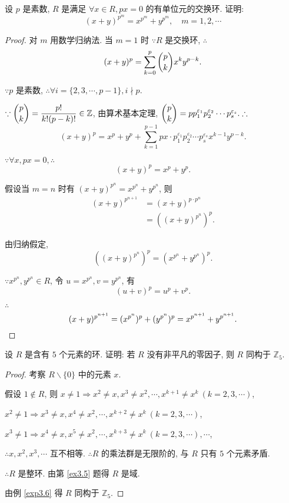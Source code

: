 \documentclass{ctexart}
\begin{document}
\begin{exercise}[3.6]
    设 $p$ 是素数, $R$ 是满足 $\forall x\in R,px=0$ 的有单位元的交换环. 证明:
    \[(x+y)^{p^m}=x^{p^m}+y^{p^m},\quad m=1,2,\cdots\]
\end{exercise}
\begin{proof}
    对 $m$ 用数学归纳法. 当 $m=1$ 时 $\because R$ 是交换环, $\therefore$
    \[(x+y)^p=\sum_{k=0}^p\dbinom{p}{k}x^ky^{p-k}.\]

    $\because p$ 是素数, $\therefore\forall i=\{2,3,\cdots,p-1\},i\nmid p$.

    $\because\dbinom{p}{k}=\dfrac{p!}{k!(p-k)!}\in\mathbb{Z}$, 由算术基本定理, $\dbinom{p}{k}=pp_1^{\varepsilon_1}p_2^{\varepsilon_2}\cdots p_s^{\varepsilon_s}.\therefore$
    \[(x+y)^p=x^p+y^p+\sum_{k=1}^{p-1}px\cdot p_1^{\varepsilon_1}p_2^{\varepsilon_2}\cdots p_s^{\varepsilon_s}x^{k-1}y^{p-k}.\]

    $\because\forall x,px=0,\therefore$
    \[(x+y)^p=x^p+y^p.\]

    假设当 $m=n$ 时有 $(x+y)^{p^n}=x^{p^n}+y^{p^n}$, 则
    \begin{align*}
        (x+y)^{p^{n+1}} & =(x+y)^{p\cdot p^n} \\
        & =((x+y)^{p^n})^p.
    \end{align*}

    由归纳假定,
    \[((x+y)^{p^n})^p=(x^{p^n}+y^{p^n})^p.\]

    $\because x^{p^n},y^{p^n}\in R$, 令 $u=x^{p^n},v=y^{p^n}$, 有
    \[(u+v)^p=u^p+v^p.\]

    $\therefore$
    \[(x+y)^{p^{n+1}}=(x^{p^n})^p+(y^{p^n})^p=x^{p^{n+1}}+y^{p^{n+1}}.\qedhere\]
\end{proof}
\begin{exercise}[3.7]
    设 $R$ 是含有 $5$ 个元素的环. 证明: 若 $R$ 没有非平凡的零因子, 则 $R$ 同构于 $\mathbb{Z}_5$.
\end{exercise}
\begin{proof}
    考察 $R\backslash\{0\}$ 中的元素 $x$.

    假设 $1\notin R$, 则 $x\neq 1\Rightarrow x^2\neq x,x^3\neq x^2,\cdots,x^{k+1}\neq x^k\ (k=2,3,\cdots)$,

    $x^2\neq 1\Rightarrow x^3\neq x,x^4\neq x^2,\cdots,x^{k+2}\neq x^k\ (k=2,3,\cdots)$,

    $x^3\neq 1\Rightarrow x^4\neq x,x^5\neq x^2,\cdots,x^{k+3}\neq x^k\ (k=2,3,\cdots),\cdots$,

    $\therefore x,x^2,x^3,\cdots$ 互不相等. $\therefore R$ 的乘法群是无限阶的, 与 $R$ 只有 $5$ 个元素矛盾.

    $\therefore R$ 是整环. 由第 \ref{ex3.5} 题得 $R$ 是域.

    由例 \ref{exp3.6} 得 $R$ 同构于 $\mathbb{Z}_5$.
\end{proof}
\end{document}
